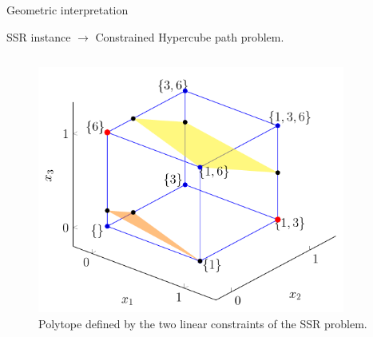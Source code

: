 \begin{frame}{Geometric interpretation}
\begin{block}{SSR instance $\rightarrow$ Constrained Hypercube path problem.}
\begin{columns}
\begin{column}{0.5\textwidth}
\begin{figure}
        \includegraphics[width=0.9\textwidth]{img/subset_2.png}
        \caption{Polytope defined by the two linear constraints of the SSR problem.\hfill \break}
        \label{fig:circle}
        \end{figure}
    \end{column}
\end{columns}
 \end{block}
\end{frame}

